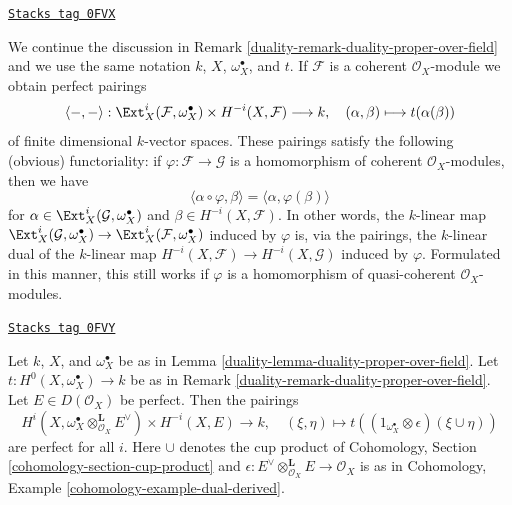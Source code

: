 \begin{remark}
\label{duality-remark-coherent-duality-proper-over-field}
\href{https://stacks.math.columbia.edu/tag/0FVX}{\texttt{Stacks tag 0FVX}}

We continue the discussion in Remark \ref{duality-remark-duality-proper-over-field}
and we use the same notation $k$, $X$, $\omega_X^\bullet$, and $t$.
If $\mathcal{F}$ is a coherent $\mathcal{O}_X$-module we obtain
perfect pairings
$$
\langle -, - \rangle :
\Ext^i_X(\mathcal{F}, \omega_X^\bullet) \times H^{-i}(X,\mathcal{F})
\longrightarrow k,\quad
(\alpha, \beta) \longmapsto t(\alpha(\beta))
$$
of finite dimensional $k$-vector spaces. These pairings satisfy the
following (obvious) functoriality: if $\varphi : \mathcal{F} \to \mathcal{G}$
is a homomorphism of coherent $\mathcal{O}_X$-modules, then we have
$$
\langle \alpha \circ \varphi, \beta \rangle =
\langle \alpha, \varphi(\beta) \rangle
$$
for $\alpha \in \Ext^i_X(\mathcal{G}, \omega_X^\bullet)$ and
$\beta \in H^{-i}(X, \mathcal{F})$. In other words, the $k$-linear map
$\Ext^i_X(\mathcal{G}, \omega_X^\bullet) \to
\Ext^i_X(\mathcal{F}, \omega_X^\bullet)$ induced by $\varphi$
is, via the pairings, the $k$-linear dual of the $k$-linear map
$H^{-i}(X, \mathcal{F}) \to H^{-i}(X, \mathcal{G})$ induced
by $\varphi$. Formulated in this manner, this still works if
$\varphi$ is a homomorphism of quasi-coherent $\mathcal{O}_X$-modules.
\end{remark}

\begin{lemma}
\label{duality-lemma-duality-proper-over-field-perfect}
\href{https://stacks.math.columbia.edu/tag/0FVY}{\texttt{Stacks tag 0FVY}}

Let $k$, $X$, and $\omega_X^\bullet$
be as in Lemma \ref{duality-lemma-duality-proper-over-field}.
Let $t : H^0(X, \omega_X^\bullet) \to k$ be as in
Remark \ref{duality-remark-duality-proper-over-field}.
Let $E \in D(\mathcal{O}_X)$ be perfect. Then the pairings
$$
H^i(X, \omega_X^\bullet \otimes_{\mathcal{O}_X}^\mathbf{L} E^\vee)
\times
H^{-i}(X, E) \longrightarrow k, \quad
(\xi, \eta) \longmapsto
t((1_{\omega_X^\bullet} \otimes \epsilon)(\xi \cup \eta))
$$
are perfect for all $i$. Here $\cup$ denotes the cup product
of Cohomology, Section \ref{cohomology-section-cup-product} and
$\epsilon : E^\vee \otimes_{\mathcal{O}_X}^\mathbf{L} E \to \mathcal{O}_X$
is as in Cohomology, Example \ref{cohomology-example-dual-derived}.
\end{lemma}

